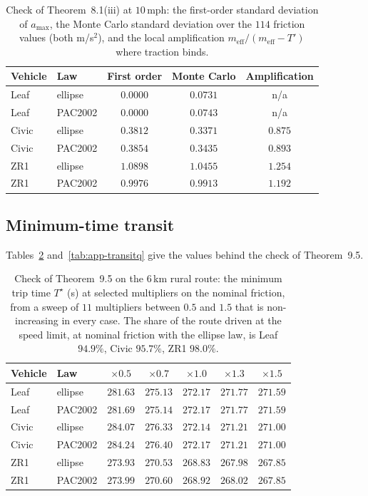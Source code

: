 \documentclass[12pt, twoside]{amsart}
\theoremstyle{definition}
\newcommand{\amax}{a_{\max}}
\newcommand{\meff}{m_{\mathrm{eff}}}
\newcommand{\mainref}[2]{#2}
\begin{document}
\begin{table}[htbp]
\centering\small
\caption{Check of Theorem~\mainref{thm:propagation}{8.1}\mainref{pr:first}{{(iii)}} at $10$\,mph: the first-order standard deviation of $\amax$, the Monte Carlo standard deviation over the $114$ friction values (both m/s$^2$), and the local amplification $\meff/(\meff-T')$ where traction binds.}\label{tab:app-first}
\begin{tabular}{llccc}
\toprule
Vehicle & Law & First order & Monte Carlo & Amplification\\
\midrule
Leaf & ellipse & $0.0000$ & $0.0731$ & n/a\\
Leaf & PAC2002 & $0.0000$ & $0.0743$ & n/a\\
Civic & ellipse & $0.3812$ & $0.3371$ & $0.875$\\
Civic & PAC2002 & $0.3854$ & $0.3435$ & $0.893$\\
ZR1 & ellipse & $1.0898$ & $1.0455$ & $1.254$\\
ZR1 & PAC2002 & $0.9976$ & $0.9913$ & $1.192$\\
\bottomrule
\end{tabular}
\end{table}
\FloatBarrier

\subsection{Minimum-time transit}

Tables~\ref{tab:app-transit} and~\ref{tab:app-transitq} give the values behind the check of
Theorem~\mainref{thm:transit}{9.5}.

\begin{table}[htbp]
\centering\small
\caption{Check of Theorem~\mainref{thm:transit}{9.5} on the $6$\,km rural route: the minimum trip time $T^\star$ (s) at selected multipliers on the nominal friction, from a sweep of $11$ multipliers between $0.5$ and $1.5$ that is non-increasing in every case. The share of the route driven at the speed limit, at nominal friction with the ellipse law, is Leaf $94.9\%$, Civic $95.7\%$, ZR1 $98.0\%$.}\label{tab:app-transit}
\begin{tabular}{llccccc}
\toprule
Vehicle & Law & $\times0.5$ & $\times0.7$ & $\times1.0$ & $\times1.3$ & $\times1.5$\\
\midrule
Leaf & ellipse & $281.63$ & $275.13$ & $272.17$ & $271.77$ & $271.59$\\
Leaf & PAC2002 & $281.69$ & $275.14$ & $272.17$ & $271.77$ & $271.59$\\
Civic & ellipse & $284.07$ & $276.33$ & $272.14$ & $271.21$ & $271.00$\\
Civic & PAC2002 & $284.24$ & $276.40$ & $272.17$ & $271.21$ & $271.00$\\
ZR1 & ellipse & $273.93$ & $270.53$ & $268.83$ & $267.98$ & $267.85$\\
ZR1 & PAC2002 & $273.99$ & $270.60$ & $268.92$ & $268.02$ & $267.85$\\
\bottomrule
\end{tabular}
\end{table}
\end{document}
